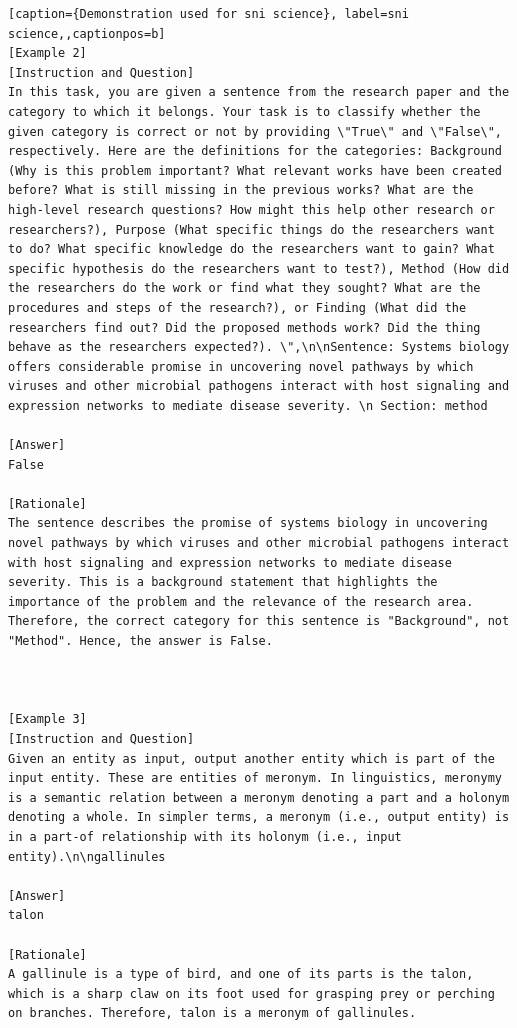 \begin{lstlisting}[caption={Demonstration used for sni science}, label=sni science,,captionpos=b]
[Example 2]
[Instruction and Question]
In this task, you are given a sentence from the research paper and the category to which it belongs. Your task is to classify whether the given category is correct or not by providing \"True\" and \"False\", respectively. Here are the definitions for the categories: Background (Why is this problem important? What relevant works have been created before? What is still missing in the previous works? What are the high-level research questions? How might this help other research or researchers?), Purpose (What specific things do the researchers want to do? What specific knowledge do the researchers want to gain? What specific hypothesis do the researchers want to test?), Method (How did the researchers do the work or find what they sought? What are the procedures and steps of the research?), or Finding (What did the researchers find out? Did the proposed methods work? Did the thing behave as the researchers expected?). \",\n\nSentence: Systems biology offers considerable promise in uncovering novel pathways by which viruses and other microbial pathogens interact with host signaling and expression networks to mediate disease severity. \n Section: method

[Answer]
False

[Rationale]
The sentence describes the promise of systems biology in uncovering novel pathways by which viruses and other microbial pathogens interact with host signaling and expression networks to mediate disease severity. This is a background statement that highlights the importance of the problem and the relevance of the research area. Therefore, the correct category for this sentence is "Background", not "Method". Hence, the answer is False.



[Example 3]
[Instruction and Question]
Given an entity as input, output another entity which is part of the input entity. These are entities of meronym. In linguistics, meronymy is a semantic relation between a meronym denoting a part and a holonym denoting a whole. In simpler terms, a meronym (i.e., output entity) is in a part-of relationship with its holonym (i.e., input entity).\n\ngallinules

[Answer]
talon

[Rationale]
A gallinule is a type of bird, and one of its parts is the talon, which is a sharp claw on its foot used for grasping prey or perching on branches. Therefore, talon is a meronym of gallinules.




\end{lstlisting}
